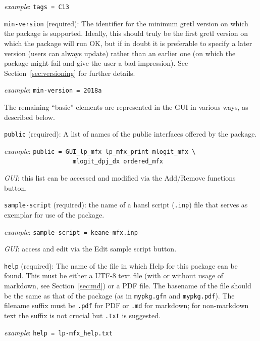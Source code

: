 \documentclass[oneside]{book}
\newcommand{\ttusage}[1]{\textit{example}: \quad \texttt{#1}}
\newcommand{\vbusage}[0]{\textit{example}: \quad}
\begin{document}
\begin{description}
  \ttusage{tags = C13}

\item \texttt{min-version} (required): The identifier for the minimum
  gretl version on which the package is supported.  Ideally, this
  should truly be the first gretl version on which the package will
  run OK, but if in doubt it is preferable to specify a later version
  (users can always update) rather than an earlier one (on which the
  package might fail and give the user a bad impression). See
  Section~\ref{sec:versioning} for further details.

   \ttusage{min-version = 2018a}

\end{description}

The remaining ``basic'' elements are represented in the GUI
in various ways, as described below.

\begin{description}

\item \texttt{public} (required): A list of names of the public
  interfaces offered by the package.

  \vbusage{} \verb|public = GUI_lp_mfx lp_mfx_print mlogit_mfx \| \\
           \verb|                   mlogit_dpj_dx ordered_mfx |

  \textit{GUI}: this list can be accessed and modified via the
  \textsf{Add/Remove functions} button.

\item \texttt{sample-script} (required): the name of a hansl
   script (\texttt{.inp}) file that serves as exemplar for use
   of the package.

   \ttusage{sample-script = keane-mfx.inp}

   \textit{GUI}: access and edit via the \textsf{Edit sample script}
   button.

 \item \texttt{help} (required): The name of the file in which Help
   for this package can be found. This must be either a UTF-8 text
   file (with or without usage of markdown, see Section~\ref{sec:md})
   or a PDF file. The basename of the file should be the same as that
   of the package (as in \texttt{mypkg.gfn} and \texttt{mypkg.pdf}).
   The filename suffix must be \texttt{.pdf} for PDF or \texttt{.md}
   for markdown; for non-markdown text the suffix is not crucial but
   \texttt{.txt} is suggested.

  \vbusage{} \verb|help = lp-mfx_help.txt|

\end{description}
\end{document}
